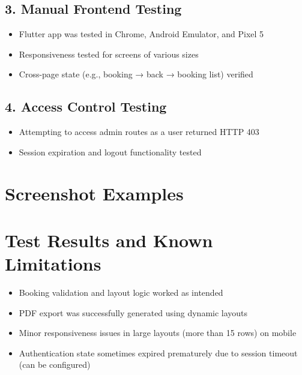 \documentclass[12pt,a4paper]{report}
\begin{document}
\subsection*{3. Manual Frontend Testing}
\begin{itemize}
    \item Flutter app was tested in Chrome, Android Emulator, and Pixel 5
    \item Responsiveness tested for screens of various sizes
    \item Cross-page state (e.g., booking → back → booking list) verified
\end{itemize}

\subsection*{4. Access Control Testing}
\begin{itemize}
    \item Attempting to access admin routes as a user returned HTTP 403
    \item Session expiration and logout functionality tested
\end{itemize}

\section{Screenshot Examples}



\section{Test Results and Known Limitations}

\begin{itemize}
    \item Booking validation and layout logic worked as intended
    \item PDF export was successfully generated using dynamic layouts
    \item Minor responsiveness issues in large layouts (more than 15 rows) on mobile
    \item Authentication state sometimes expired prematurely due to session timeout (can be configured)
\end{itemize}
\end{document}

